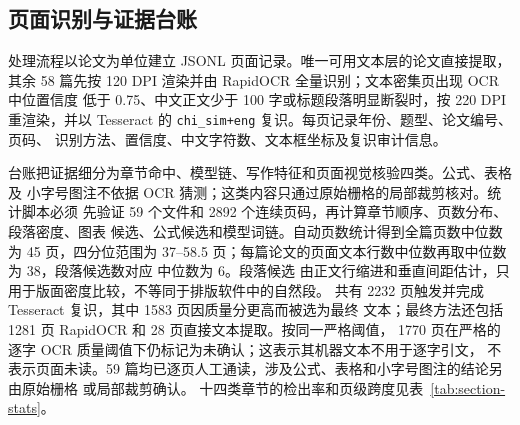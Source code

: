 \subsection{页面识别与证据台账}

处理流程以论文为单位建立 JSONL 页面记录。唯一可用文本层的论文直接提取，其余
58 篇先按 120 DPI 渲染并由 RapidOCR 全量识别；文本密集页出现 OCR 中位置信度
低于 0.75、中文正文少于 100 字或标题段落明显断裂时，按 220 DPI 重渲染，并以
Tesseract 的 \texttt{chi\_sim+eng} 复识。每页记录年份、题型、论文编号、页码、
识别方法、置信度、中文字符数、文本框坐标及复识审计信息。

台账把证据细分为章节命中、模型链、写作特征和页面视觉核验四类。公式、表格及
小字号图注不依据 OCR 猜测；这类内容只通过原始栅格的局部裁剪核对。统计脚本必须
先验证 59 个文件和 2892 个连续页码，再计算章节顺序、页数分布、段落密度、图表
候选、公式候选和模型词链。自动页数统计得到全篇页数中位数为 45 页，四分位范围为
37--58.5 页；每篇论文的页面文本行数中位数再取中位数为 38，段落候选数对应
中位数为 6。段落候选
由正文行缩进和垂直间距估计，只用于版面密度比较，不等同于排版软件中的自然段。
共有 2232 页触发并完成 Tesseract 复识，其中 1583 页因质量分更高而被选为最终
文本；最终方法还包括 1281 页 RapidOCR 和 28 页直接文本提取。按同一严格阈值，
1770 页在严格的逐字 OCR 质量阈值下仍标记为未确认；这表示其机器文本不用于逐字引文，
不表示页面未读。59 篇均已逐页人工通读，涉及公式、表格和小字号图注的结论另由原始栅格
或局部裁剪确认。
十四类章节的检出率和页级跨度见表~\ref{tab:section-stats}。

